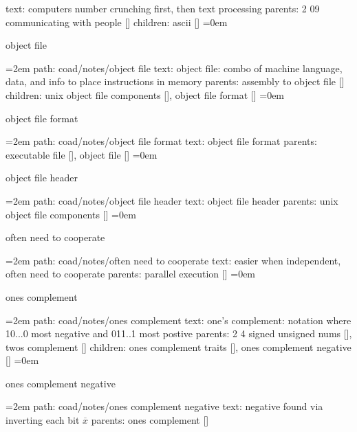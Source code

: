 \smallskip
text:  computers number crunching first, then text processing
\smallskip
parents:  2 09 communicating with people []
\smallskip
children: ascii []
\smallskip
\leftskip=0em
\par\endgroup
\bigskip
{}
object file
\smallskip
\par\begingroup
\leftskip=2em
path: coad/notes/object file
\smallskip
text:  object file: combo of machine language, data, and info to place instructions in memory
\smallskip
parents:  assembly to object file []
\smallskip
children: unix object file components [], object file format []
\smallskip
\leftskip=0em
\par\endgroup
\bigskip
{}
object file format
\smallskip
\par\begingroup
\leftskip=2em
path: coad/notes/object file format
\smallskip
text:  object file format
\smallskip
parents:  executable file [], object file []
\smallskip
\leftskip=0em
\par\endgroup
\bigskip
{}
object file header
\smallskip
\par\begingroup
\leftskip=2em
path: coad/notes/object file header
\smallskip
text:  object file header
\smallskip
parents:  unix object file components []
\smallskip
\leftskip=0em
\par\endgroup
\bigskip
{}
often need to cooperate
\smallskip
\par\begingroup
\leftskip=2em
path: coad/notes/often need to cooperate
\smallskip
text:  easier when independent, often need to cooperate
\smallskip
parents:  parallel execution []
\smallskip
\leftskip=0em
\par\endgroup
\bigskip
{}
ones complement
\smallskip
\par\begingroup
\leftskip=2em
path: coad/notes/ones complement
\smallskip
text:  one's complement: notation where 10...0 most negative and 011..1 most postive
\smallskip
parents:  2 4 signed unsigned nums [], twos complement []
\smallskip
children: ones complement traits [], ones complement negative []
\smallskip
\leftskip=0em
\par\endgroup
\bigskip
{}
ones complement negative
\smallskip
\par\begingroup
\leftskip=2em
path: coad/notes/ones complement negative
\smallskip
text:  negative found via inverting each bit $\overline{x}$
\smallskip
parents:  ones complement []
